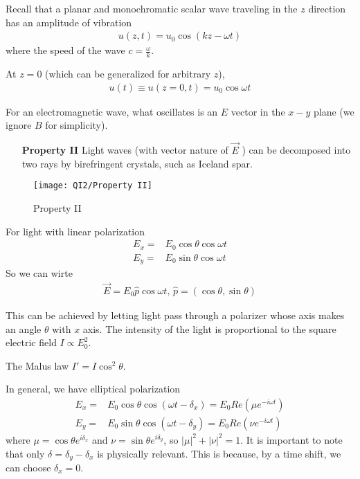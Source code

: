 Recall that a planar and monochromatic scalar wave traveling in the $z$ direction has an amplitude of vibration
\begin{align*}
    u(z,t)=u_0\cos(kz-\omega t)
\end{align*}
where the speed of the wave $c=\frac{\omega}{k}$. 

At $z = 0$ (which can be generalized for arbitrary $z$), 
\begin{align*}
    u(t)\equiv u(z=0,t)=u_0 \cos\omega t
\end{align*}

For an electromagnetic wave, what oscillates is an $E$ vector in the $x -y$ plane (we ignore $B$ for simplicity).

\begin{itemize}
    \item [\textbf{Property II}]Light waves (with vector nature of $\vec{E}$ ) can be decomposed into two rays by birefringent crystals, such as Iceland spar.
\end{itemize}

\begin{figure}[H]
    \centering
    \texttt{[image: QI2/Property II]}
    \caption{Property II}
\end{figure}

For light with linear polarization
\begin{align*}
    E_x=& E_0\cos\theta\cos\omega t \\ 
    E_y=& E_0\sin\theta\cos\omega t
\end{align*}
So we can wirte
\begin{align*}
    \vec{E}=E_0 \hat{p} \cos\omega t,\,\hat{p}=(\cos\theta, \sin\theta)
\end{align*}

This can be achieved by letting light pass through a polarizer whose axis makes an angle $\theta$ with $x$ axis. The intensity of the light is proportional to the square electric field $I \propto E_0^2$. 

The Malus law $I'=I\cos^2\theta$.

In general, we have elliptical polarization
\begin{align*}
    E_x=& E_0\cos\theta\cos(\omega t-\delta_x)=E_0 Re\left( \mu e^{-i\omega t} \right) \\ 
    E_y=& E_0\sin\theta\cos(\omega t-\delta_y)=E_0 Re\left( \nu  e^{-i\omega t} \right)
\end{align*}
where $\mu=\cos\theta e^{i\delta_x}$ and $\nu=\sin\theta e^{i\delta_y}$, so $|\mu|^2+|\nu|^2=1$. It is important to note that only $\delta=\delta_y-\delta_x$ is physically relevant. This is because, by a time shift, we can choose $\delta_x=0$. 

